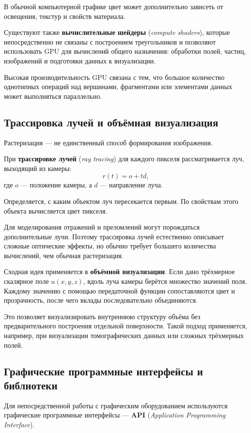 В обычной компьютерной графике цвет может дополнительно зависеть от освещения, текстур и свойств материала.

Существуют также \textbf{вычислительные шейдеры} (\textit{compute shaders}), которые непосредственно не связаны с построением треугольников и позволяют использовать GPU для вычислений общего назначения: обработки полей, частиц, изображений и подготовки данных к визуализации.

Высокая производительность GPU связана с тем, что большое количество однотипных операций над вершинами, фрагментами или элементами данных может выполняться параллельно.

\subsection{Трассировка лучей и объёмная визуализация}

Растеризация --- не единственный способ формирования изображения.

При \textbf{трассировке лучей} (\textit{ray tracing}) для каждого пикселя рассматривается луч, выходящий из камеры:
\[
r(t)=o+td,
\]
где $o$ --- положение камеры, а $d$ --- направление луча.

Определяется, с каким объектом луч пересекается первым. По свойствам этого объекта вычисляется цвет пикселя.

Для моделирования отражений и преломлений могут порождаться дополнительные лучи. Поэтому трассировка лучей естественно описывает сложные оптические эффекты, но обычно требует большего количества вычислений, чем обычная растеризация.

Сходная идея применяется в \textbf{объёмной визуализации}. Если дано трёхмерное скалярное поле $u(x,y,z)$, вдоль луча камеры берётся множество значений поля. Каждому значению с помощью передаточной функции сопоставляются цвет и прозрачность, после чего вклады последовательно объединяются.

Это позволяет визуализировать внутреннюю структуру объёма без предварительного построения отдельной поверхности. Такой подход применяется, например, при визуализации томографических данных или сложных трёхмерных полей.

\subsection{Графические программные интерфейсы и библиотеки}

Для непосредственной работы с графическим оборудованием используются графические программные интерфейсы --- \textbf{API} (\textit{Application Programming Interface}).

